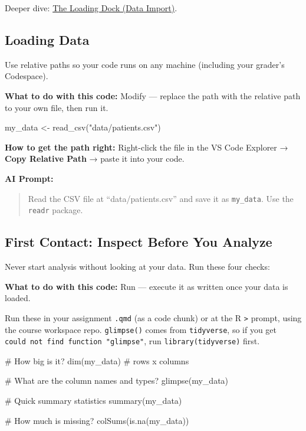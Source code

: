 \documentclass[
  letterpaper,
  DIV=11,
  numbers=noendperiod,
  oneside]{scrreprt}
\newenvironment{Shaded}{\begin{snugshade}}{\end{snugshade}}
\newcommand{\CommentTok}[1]{\textcolor[rgb]{0.37,0.37,0.37}{#1}}
\newcommand{\FunctionTok}[1]{\textcolor[rgb]{0.28,0.35,0.67}{#1}}
\newcommand{\NormalTok}[1]{\textcolor[rgb]{0.00,0.23,0.31}{#1}}
\newcommand{\OtherTok}[1]{\textcolor[rgb]{0.00,0.23,0.31}{#1}}
\newcommand{\StringTok}[1]{\textcolor[rgb]{0.13,0.47,0.30}{#1}}
\begin{document}
Deeper dive: \href{r05-data-import.qmd}{The Loading Dock (Data Import)}.

\subsection*{Loading Data}\label{loading-data}

Use relative paths so your code runs on any machine (including your
grader's Codespace).

\textbf{What to do with this code:} Modify --- replace the path with the
relative path to your own file, then run it.

\begin{Shaded}
\begin{Highlighting}[numbers=left,,]
\NormalTok{my\_data }\OtherTok{\textless{}{-}} \FunctionTok{read\_csv}\NormalTok{(}\StringTok{"data/patients.csv"}\NormalTok{)}
\end{Highlighting}
\end{Shaded}

\textbf{How to get the path right:} Right-click the file in the VS Code
Explorer → \textbf{Copy Relative Path} → paste it into your code.

\textbf{AI Prompt:}

\begin{quote}
Read the CSV file at ``data/patients.csv'' and save it as
\texttt{my\_data}. Use the \texttt{readr} package.
\end{quote}

\subsection*{First Contact: Inspect Before You
Analyze}\label{first-contact-inspect-before-you-analyze}

Never start analysis without looking at your data. Run these four
checks:

\textbf{What to do with this code:} Run --- execute it as written once
your data is loaded.

Run these in your assignment \texttt{.qmd} (as a code chunk) or at the R
\texttt{\textgreater{}} prompt, using the course workspace repo.
\texttt{glimpse()} comes from \texttt{tidyverse}, so if you get
\texttt{could\ not\ find\ function\ "glimpse"}, run
\texttt{library(tidyverse)} first.

\begin{Shaded}
\begin{Highlighting}[numbers=left,,]
\CommentTok{\# How big is it?}
\FunctionTok{dim}\NormalTok{(my\_data)          }\CommentTok{\# rows x columns}

\CommentTok{\# What are the column names and types?}
\FunctionTok{glimpse}\NormalTok{(my\_data)}

\CommentTok{\# Quick summary statistics}
\FunctionTok{summary}\NormalTok{(my\_data)}

\CommentTok{\# How much is missing?}
\FunctionTok{colSums}\NormalTok{(}\FunctionTok{is.na}\NormalTok{(my\_data))}
\end{Highlighting}
\end{Shaded}
\end{document}
